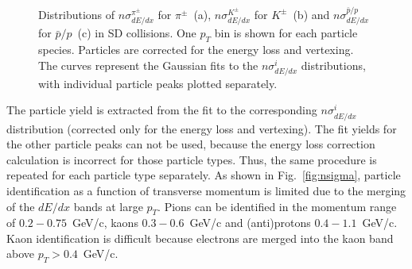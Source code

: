 \begin{figure}[H]
{			\begin{subfigure}[b]{\linewidth}{
					}
			\end{subfigure}
		}
	\caption[Distributions of $n\sigma^{\pi^\pm}_{dE/dx}$ for $\pi^\pm$, $n\sigma^{K^\pm}_{dE/dx}$ for $K^\pm$ and $n\sigma^{\bar{p}/p}_{dE/dx}$ for $\bar{p}/p$ in SD collisions]{Distributions of $n\sigma^{\pi^\pm}_{dE/dx}$ for $\pi^\pm$~(a), $n\sigma^{K^\pm}_{dE/dx}$ for $K^\pm$~(b) and $n\sigma^{\bar{p}/p}_{dE/dx}$ for $\bar{p}/p$~(c) in SD collisions. One $p_T$ bin is shown for each particle species. Particles are corrected for the energy loss and vertexing. The curves represent the Gaussian fits to the $n\sigma^{i}_{dE/dx}$ distributions, with individual particle peaks plotted separately.}
	\label{fig:nsigmafit}
\end{figure}
The particle yield is extracted from the fit to the corresponding
$n\sigma^{i}_{dE/dx}$  distribution (corrected only for the energy loss and vertexing). The fit yields for the other particle peaks can not be used, because the energy loss correction calculation is incorrect for those particle types.
Thus, the same procedure is repeated for each particle
type separately. As shown in Fig.~\ref{fig:nsigma}, particle identification as a function
of transverse momentum  is limited due to the merging
of the $dE/dx$ bands at large $p_T$. Pions can be identified
in the momentum range of $0.2-0.75$~GeV/c, kaons
$0.3-0.6$~GeV/c and (anti)protons $0.4-1.1$~GeV/c. Kaon
identification is difficult because electrons
are merged into the kaon band above $p_T > 0.4$~GeV/c. 